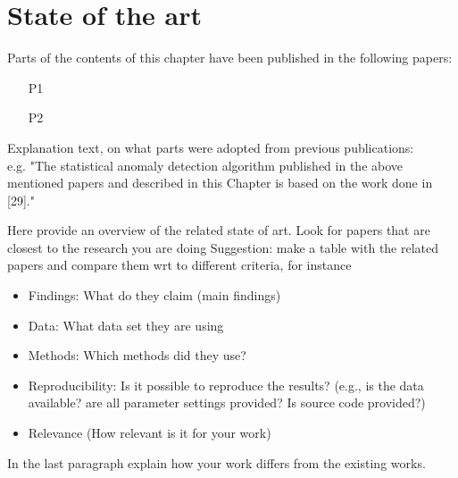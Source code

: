 \chapter{State of the art} \label{sec.state_of_art}

\begin{Prev.Publ}
	Parts of the contents of this chapter have been published in the following papers:
	\begin{enumerate}
		\item [\lbrack P1\rbrack]  %
		\item [\lbrack P2\rbrack] 
	\end{enumerate}	
	
	Explanation text, on what parts were adopted from previous publications:\\
	e.g. "The statistical anomaly detection algorithm published in the above mentioned papers and described in this
	Chapter is based on the work done in [29]."	
\end{Prev.Publ}



Here provide an overview of the related state of art. Look for papers that are closest to the research you are doing
Suggestion: make a table with the related papers and compare them wrt to different criteria, for instance

\begin{itemize}
	\item Findings: What do they claim (main findings)
	\item Data: What data set they are using
	\item Methods: Which methods did they use?
	\item Reproducibility: Is it possible to reproduce the results? (e.g., is the data available? are all parameter settings provided? Is source code provided?)
	\item Relevance (How relevant is it for your work)
\end{itemize}


In the last paragraph explain how your work differs from the existing works.



\newpage
